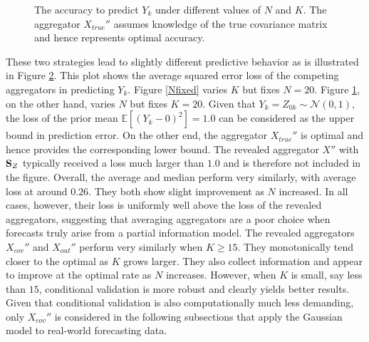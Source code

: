 \documentclass[11pt]{article}
\newcommand{\E}{\mathbb{E}}
\theoremstyle{definition}
\theoremstyle{definition}
\def\SS{{\bf S}}
\def\E{{\mathbb E}}
\begin{document}
\begin{figure}[t!]
\begin{subfigure}{0.5\textwidth}
                                \label{Kfixed}
        \end{subfigure}
         \caption{The accuracy to predict $Y_k$ under different values of $N$ and $K$. The aggregator $X_{true}''$ assumes knowledge of the true covariance matrix and hence represents  optimal accuracy.}
        \label{XEstimation}
\end{figure}





These two strategies lead to slightly different predictive behavior as is illustrated in Figure \ref{XEstimation}. This plot shows the average squared error loss of the competing aggregators in predicting $Y_k$. Figure \ref{Nfixed} varies $K$ but fixes $N = 20$.  Figure \ref{Kfixed}, on the other hand,  varies $N$ but fixes $K = 20$. Given that $Y_k = Z_{0k} \sim \mathcal{N}(0,1)$, the loss of the prior mean $\E[(Y_k-0)^2] = 1.0$ can be considered as the upper bound in prediction error. On the other end, the aggregator $X_{true}''$ is optimal and hence provides the corresponding lower bound. The revealed aggregator $X''$ with $\SS_Z$ typically received a loss much larger than $1.0$ and is therefore not included in the figure. Overall, the average and median perform very similarly, with average loss at around $0.26$. They both show slight improvement as $N$ increased. In all cases, however, their loss is uniformly well above the loss of the revealed aggregators, suggesting that averaging aggregators are a poor choice when forecasts truly arise from a partial information model. The revealed aggregators $X_{cov}''$ and $X_{out}''$ perform very similarly when $K \geq 15$. They monotonically tend closer to the optimal as $K$ grows larger. They also collect information and appear to improve at the optimal rate as $N$ increases. However, when $K$ is small, say less than $15$, conditional validation is more robust and clearly yields better results. Given that conditional validation is also computationally much less demanding, only $X_{cov}''$ is considered in the following subsections that apply the Gaussian model to real-world forecasting data. 
  



\end{document}
